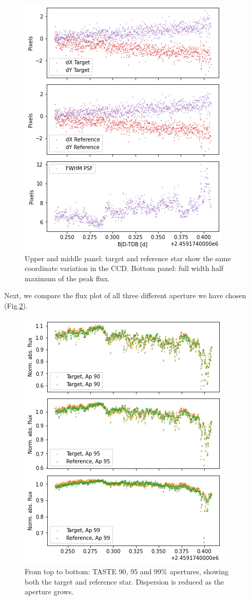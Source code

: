 \documentclass{aa}
\begin{document}
\begin{figure}[h]
    \centering  
    \includegraphics[scale=0.5, angle=0]{pictures/target-ref_position.png}
    \caption{Upper and middle panel: target and reference star show the same coordinate variation in the CCD. Bottom panel: full width half maximum of the peak flux.}
    \label{fig:target-ref_position}
\end{figure}
Next, we compare the flux plot of all three different aperture we have chosen (Fig.\ref{fig:apertures}).
\begin{figure}[h]
    \centering  
    \includegraphics[scale=0.5, angle=0]{pictures/apertures.png}
    \caption{From top to bottom: TASTE 90, 95 and 99\% apertures, showing both the target and reference star. Dispersion is reduced as the aperture grows.}
    \label{fig:apertures}
\end{figure}
\end{document}
